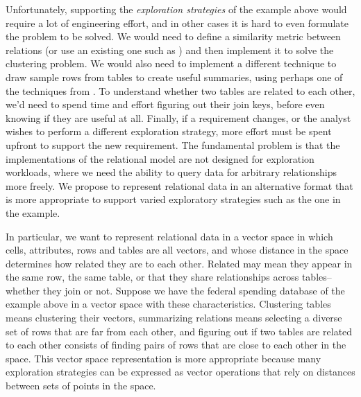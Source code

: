 Unfortunately, supporting the \emph{exploration strategies} of the example above
would require a lot of engineering effort, and in other cases it is hard to even
formulate the problem to be solved. We would need to define a similarity metric
between relations (or use an existing one such as \cite{summarydb}) and then implement it
to solve the clustering problem. We would also need to implement a different
technique to draw sample rows from tables to create useful summaries, using
perhaps one of the techniques from \cite{diversifydb}. To understand whether two tables are
related to each other, we'd need to spend time and effort figuring out their
join keys, before even knowing if they are useful at all. Finally, if a
requirement changes, or the analyst wishes to perform a different exploration
strategy, more effort must be spent upfront to support
the new requirement. The fundamental problem is that the implementations of the
relational model are not designed for exploration workloads, where we need the
ability to query data for arbitrary relationships more freely. We propose to
represent relational data in an alternative format that is more appropriate to
support varied exploratory strategies such as the one in the example.

In particular, we want to represent relational data in a vector space in which
cells, attributes, rows and tables are all vectors, and whose distance in the
space determines how related they are to each other. Related may mean they
appear in the same row, the same table, or that they share relationships across
tables--whether they join or not. Suppose we have the federal spending database
of the example above in a vector space with these characteristics. Clustering
tables means clustering their vectors, summarizing relations means selecting a
diverse set of rows that are far from each other, and figuring out if two tables
are related to each other consists of finding pairs of rows that are close to
each other in the space. This vector space representation is more appropriate
because many exploration strategies can be expressed as vector operations that
rely on distances between sets of points in the space.

